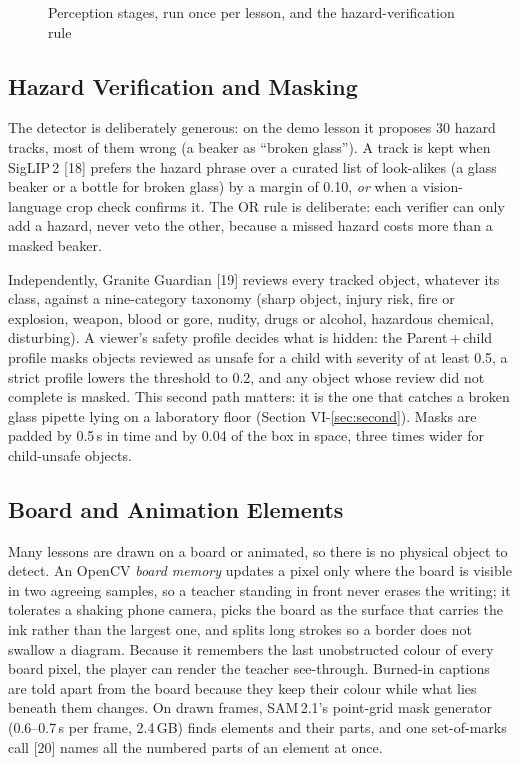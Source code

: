 \documentclass[9pt,a4paper]{extarticle}
\begin{document}
\begin{figure}[t]
\centering
\resizebox{0.97\textwidth}{!}{}
\caption{Perception stages, run once per lesson, and the hazard-verification rule}
\label{fig:pipe}
\end{figure}

\subsection{Hazard Verification and Masking}
The detector is deliberately generous: on the demo lesson it proposes 30 hazard tracks, most of them wrong (a beaker as
``broken glass''). A track is kept when SigLIP\,2 [18] prefers the hazard phrase over a curated list of look-alikes (a
glass beaker or a bottle for broken glass) by a margin of 0.10, \emph{or} when a vision-language crop check confirms it.
The OR rule is deliberate: each verifier can only add a hazard, never veto the other, because a missed hazard costs more
than a masked beaker.

Independently, Granite Guardian [19] reviews every tracked object, whatever its class, against a nine-category taxonomy
(sharp object, injury risk, fire or explosion, weapon, blood or gore, nudity, drugs or alcohol, hazardous chemical,
disturbing). A viewer's safety profile decides what is hidden: the Parent\,+\,child profile masks objects reviewed as
unsafe for a child with severity of at least 0.5, a strict profile lowers the threshold to 0.2, and any object whose
review did not complete is masked. This second path matters: it is the one that catches a broken glass pipette lying on
a laboratory floor (Section VI-\ref{sec:second}). Masks are padded by 0.5\,s in time and by 0.04 of the box in space, three
times wider for child-unsafe objects.

\subsection{Board and Animation Elements}
Many lessons are drawn on a board or animated, so there is no physical object to detect. An OpenCV \emph{board memory}
updates a pixel only where the board is visible in two agreeing samples, so a teacher standing in front never erases
the writing; it tolerates a shaking phone camera, picks the board as the surface that carries the ink rather than the
largest one, and splits long strokes so a border does not swallow a diagram. Because it remembers the last unobstructed
colour of every board pixel, the player can render the teacher see-through. Burned-in captions are told apart from the
board because they keep their colour while what lies beneath them changes. On drawn frames, SAM\,2.1's point-grid mask
generator (0.6--0.7\,s per frame, 2.4\,GB) finds elements and their parts, and one set-of-marks call [20] names all the
numbered parts of an element at once.
\end{document}
